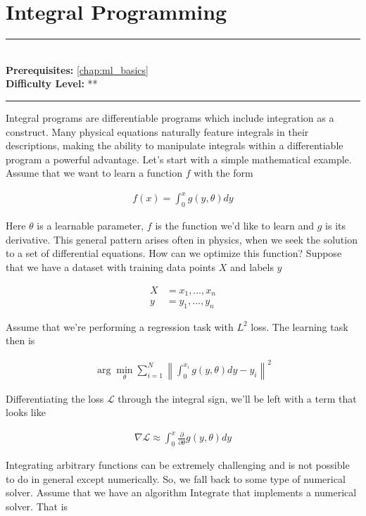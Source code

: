 \documentclass[book.tex]{subfiles}
\begin{document}
\chapter{Integral Programming}
\label{ch:integralprog}
\noindent\rule{11cm}{0.4pt} \\
\textbf{Prerequisites:}  \autoref{chap:ml_basics} %
\\
\textbf{Difficulty Level:} ** \\
\noindent\rule{11cm}{0.4pt}
\vspace{5mm}


Integral programs are differentiable programs which include integration as a construct. Many physical equations naturally feature integrals in their descriptions, making the ability to manipulate integrals within a differentiable program a powerful advantage. Let's start with a simple mathematical example. Assume that we want to learn a function $f$ with the form

\begin{align} f(x) = \int_0^x g(y, \theta) dy \end{align}

Here $\theta$ is a learnable parameter, $f$ is the function we'd like to learn and $g$ is its derivative. This general pattern arises often in physics, when we seek the solution to a set of differential equations. How can we optimize this function? Suppose that we have a dataset with training data points $X$ and labels $y$

\begin{align}
    X &= x_1,\dotsc, x_n \\
    y &= y_1, \dotsc, y_n
\end{align}

Assume that we're performing a regression task with $L^2$ loss. The learning task then is

\begin{align}
    \arg\min_{\theta} \sum_{i=1}^N \left \| \int_0^{x_i} g(y, \theta) dy - y_i\right \|^2
\end{align}

Differentiating the loss $\mathcal{L}$ through the integral sign, we'll be left with a term that looks like 

\begin{align}
\nabla \mathcal{L} \approx \int_0^x \frac{\partial}{ \partial \theta} g(y, \theta) dy \end{align}

Integrating arbitrary functions can be extremely challenging and is not possible to do in general except numerically. So, we fall back to some type of numerical solver. Assume that we have an algorithm $\textrm{Integrate}$ that implements a numerical solver. That is
\end{document}
